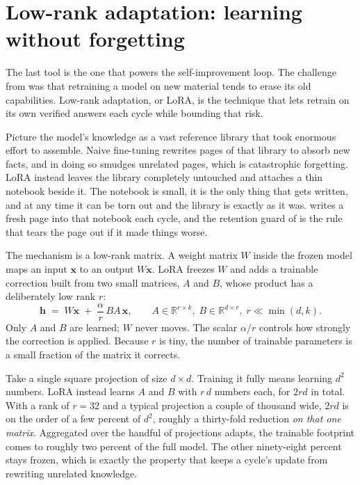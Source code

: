 \section{Low-rank adaptation: learning without forgetting}
\label{sec:prereq-lora}

The last tool is the one that powers the self-improvement loop. The challenge from
 was that retraining a model on new material tends to erase its
old capabilities. Low-rank adaptation, or LoRA, is the technique that lets \caem{}
retrain on its own verified answers each cycle while bounding that risk.

\begin{intuition}
Picture the model's knowledge as a vast reference library that took enormous effort
to assemble. Naive fine-tuning rewrites pages of that library to absorb new facts,
and in doing so smudges unrelated pages, which is catastrophic forgetting. LoRA
instead leaves the library completely untouched and attaches a thin notebook beside
it. The notebook is small, it is the only thing that gets written, and at any time
it can be torn out and the library is exactly as it was. \caem{} writes a fresh
page into that notebook each cycle, and the retention guard of  is
the rule that tears the page out if it made things worse.
\end{intuition}

The mechanism is a low-rank matrix. A weight matrix $W$ inside the frozen model maps
an input $\mathbf{x}$ to an output $W\mathbf{x}$. LoRA freezes $W$ and adds a
trainable correction built from two small matrices, $A$ and $B$, whose product has a
deliberately low rank $r$:
\[
  \mathbf{h} \;=\; W\mathbf{x} \;+\; \frac{\alpha}{r}\,B A\,\mathbf{x},
  \qquad
  A \in \mathbb{R}^{r \times k},\;
  B \in \mathbb{R}^{d \times r},\;
  r \ll \min(d, k).
\]
Only $A$ and $B$ are learned; $W$ never moves. The scalar $\alpha/r$ controls how
strongly the correction is applied. Because $r$ is tiny, the number of trainable
parameters is a small fraction of the matrix it corrects.

\begin{workedexample}
Take a single square projection of size $d \times d$. Training it fully means
learning $d^2$ numbers. LoRA instead learns $A$ and $B$ with $r\,d$ numbers each,
for $2rd$ in total. With a rank of $r=32$ and a typical projection a couple of
thousand wide, $2rd$ is on the order of a few percent of $d^2$, roughly a thirty-fold
reduction \emph{on that one matrix}. Aggregated over the handful of projections
\caem{} adapts, the trainable footprint comes to roughly two percent of the full
model. The other ninety-eight percent stays frozen, which is exactly the property
that keeps a cycle's update from rewriting unrelated knowledge.
\end{workedexample}

